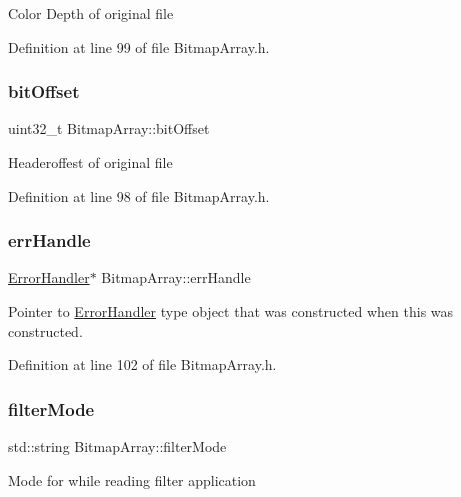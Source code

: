 Color Depth of original file 

Definition at line 99 of file Bitmap\+Array.\+h.

\mbox{\label{classBitmapArray_abcab200a1eb84331f7c79702e9199694}} 
\subsubsection{\texorpdfstring{bitOffset}{bitOffset}}
{\footnotesize\ttfamily uint32\+\_\+t Bitmap\+Array\+::bit\+Offset\hspace{0.3cm}{\ttfamily [private]}}

Headeroffest of original file 

Definition at line 98 of file Bitmap\+Array.\+h.

\mbox{\label{classBitmapArray_a8d95e8cb2bf8c0f618465a389e8ffe4d}} 
\subsubsection{\texorpdfstring{errHandle}{errHandle}}
{\footnotesize\ttfamily \mbox{\hyperlink{classErrorHandler}{Error\+Handler}}$\ast$ Bitmap\+Array\+::err\+Handle\hspace{0.3cm}{\ttfamily [private]}}

Pointer to \mbox{\hyperlink{classErrorHandler}{Error\+Handler}} type object that was constructed when this was constructed. 

Definition at line 102 of file Bitmap\+Array.\+h.

\mbox{\label{classBitmapArray_adfd3e5a1eed42e37b22a4f2f2560ad67}} 
\subsubsection{\texorpdfstring{filterMode}{filterMode}}
{\footnotesize\ttfamily std\+::string Bitmap\+Array\+::filter\+Mode\hspace{0.3cm}{\ttfamily [private]}}

Mode for while reading filter application 

